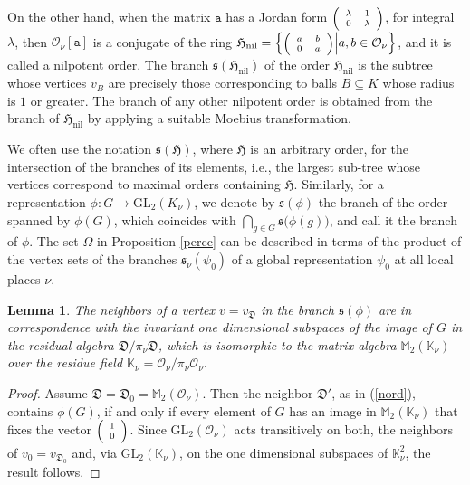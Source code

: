 \documentclass{article}
\newtheorem{Lem}[Prop]{Lemma}
\theoremstyle{definition}
\theoremstyle{remark}
\newcommand\sbmattrix[4]{\textnormal{\scriptsize$\left(\begin{array}{cc}#1&#2\\#3&#4\end{array}\right)$\normalsize}}
\newcommand\sbvecttor[2]{\textnormal{\scriptsize$\left(\begin{array}{cc}#1\\#2\end{array}\right)$\normalsize}}
\begin{document}
On the other hand, when the matrix $\mathtt{a}$ has a Jordan form
$\sbmattrix {\lambda}10{\lambda}$, for integral $\lambda$,
then $\mathcal{O}_\nu[\mathtt{a}]$ is a conjugate of the ring
$\mathfrak{H}_{\mathrm{nil}}=
\left\{\sbmattrix ab0a\Big|a,b\in\mathcal{O}_\nu\right\}$,
and it is called a nilpotent order. The branch
$\mathfrak{s}(\mathfrak{H}_{\mathrm{nil}})$ of the
order $\mathfrak{H}_{\mathrm{nil}}$ is the subtree whose vertices
$v_B$ are precisely those corresponding to balls $B\subseteq K$ whose
radius is $1$ or greater. The branch of any other nilpotent order
is obtained from the branch of $\mathfrak{H}_{\mathrm{nil}}$ by applying 
a suitable Moebius transformation.

We often use the notation $\mathfrak{s}(\mathfrak{H})$, where 
$\mathfrak{H}$ is an arbitrary order, for the 
intersection of the branches
of its elements, i.e., the largest sub-tree whose 
vertices correspond
to maximal orders containing $\mathfrak{H}$. Similarly, for
a representation $\phi:G\rightarrow\mathrm{GL}_2(K_\nu)$, 
we denote
by $\mathfrak{s}(\phi)$ the branch of the order spanned by
$\phi(G)$, which coincides with 
$\bigcap_{g\in G}\mathfrak{s}\big(\phi(g)\big)$,
and call it the branch of $\phi$. The set 
$\Omega$ in Proposition
\ref{percc} can be described in terms of the product 
of the vertex
sets of the branches $\mathfrak{s}_\nu(\psi_0)$ of 
a global representation $\psi_0$ at all local places
$\nu$.

\begin{Lem}\label{l31}
The neighbors of a vertex $v=v_{\mathfrak{D}}$ in the
branch $\mathfrak{s}(\phi)$ are in correspondence with
the invariant one dimensional subspaces of the image of $G$ in
the residual algebra
$\mathfrak{D}/\pi_\nu\mathfrak{D}$, which is isomorphic
to the matrix algebra $\mathbb{M}_2(\mathbb{K}_\nu)$
over the residue field $\mathbb{K}_\nu=
\mathcal{O}_\nu/\pi_\nu\mathcal{O}_\nu$.
\end{Lem}

\begin{proof}
Assume $\mathfrak{D}=\mathfrak{D}_0=\mathbb{M}_2(\mathcal{O}_\nu)$.
Then the neighbor $\mathfrak{D}'$, as in (\ref{nord}), contains
$\phi(G)$, if and only if every element of $G$ has an image
in $\mathbb{M}_2(\mathbb{K}_\nu)$ that fixes the vector $\sbvecttor10$.
Since $\mathrm{GL}_2(\mathcal{O}_\nu)$ acts transitively on both,
the neighbors of $v_0=v_{\mathfrak{D}_0}$ and, via 
$\mathrm{GL}_2(\mathbb{K}_\nu)$, on the one dimensional
subspaces of $\mathbb{K}_\nu^2$, the result follows.
\end{proof}
\end{document}
